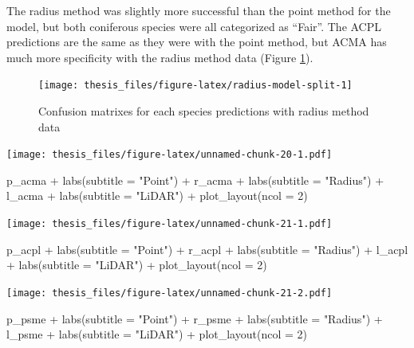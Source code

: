 \documentclass[12pt,twoside]{reedthesis}
\newenvironment{Shaded}{\begin{snugshade}}{\end{snugshade}}
\newcommand{\AttributeTok}[1]{\textcolor[rgb]{0.77,0.63,0.00}{#1}}
\newcommand{\DecValTok}[1]{\textcolor[rgb]{0.00,0.00,0.81}{#1}}
\newcommand{\FunctionTok}[1]{\textcolor[rgb]{0.00,0.00,0.00}{#1}}
\newcommand{\NormalTok}[1]{#1}
\newcommand{\SpecialCharTok}[1]{\textcolor[rgb]{0.00,0.00,0.00}{#1}}
\newcommand{\StringTok}[1]{\textcolor[rgb]{0.31,0.60,0.02}{#1}}
\begin{document}
The radius method was slightly more successful than the point method for the model, but both coniferous species were all categorized as ``Fair''. The ACPL predictions are the same as they were with the point method, but ACMA has much more specificity with the radius method data (Figure \ref{fig:radius-model-split}).
\begin{figure}
\texttt{[image: thesis\_files/figure-latex/radius-model-split-1]} \caption[Confusion matrixes for Radius data model]{Confusion matrixes for each species predictions with radius method data}\label{fig:radius-model-split}
\end{figure}
\texttt{[image: thesis\_files/figure-latex/unnamed-chunk-20-1.pdf]}
\begin{Shaded}
\begin{Highlighting}[]
\NormalTok{p\_acma }\SpecialCharTok{+} \FunctionTok{labs}\NormalTok{(}\AttributeTok{subtitle =} \StringTok{"Point"}\NormalTok{) }\SpecialCharTok{+}\NormalTok{ r\_acma }\SpecialCharTok{+} \FunctionTok{labs}\NormalTok{(}\AttributeTok{subtitle =} \StringTok{"Radius"}\NormalTok{) }\SpecialCharTok{+}
\NormalTok{    l\_acma }\SpecialCharTok{+} \FunctionTok{labs}\NormalTok{(}\AttributeTok{subtitle =} \StringTok{"LiDAR"}\NormalTok{) }\SpecialCharTok{+} \FunctionTok{plot\_layout}\NormalTok{(}\AttributeTok{ncol =} \DecValTok{2}\NormalTok{)}
\end{Highlighting}
\end{Shaded}
\texttt{[image: thesis\_files/figure-latex/unnamed-chunk-21-1.pdf]}
\begin{Shaded}
\begin{Highlighting}[]
\NormalTok{p\_acpl }\SpecialCharTok{+} \FunctionTok{labs}\NormalTok{(}\AttributeTok{subtitle =} \StringTok{"Point"}\NormalTok{) }\SpecialCharTok{+}\NormalTok{ r\_acpl }\SpecialCharTok{+} \FunctionTok{labs}\NormalTok{(}\AttributeTok{subtitle =} \StringTok{"Radius"}\NormalTok{) }\SpecialCharTok{+}
\NormalTok{    l\_acpl }\SpecialCharTok{+} \FunctionTok{labs}\NormalTok{(}\AttributeTok{subtitle =} \StringTok{"LiDAR"}\NormalTok{) }\SpecialCharTok{+} \FunctionTok{plot\_layout}\NormalTok{(}\AttributeTok{ncol =} \DecValTok{2}\NormalTok{)}
\end{Highlighting}
\end{Shaded}
\texttt{[image: thesis\_files/figure-latex/unnamed-chunk-21-2.pdf]}
\begin{Shaded}
\begin{Highlighting}[]
\NormalTok{p\_psme }\SpecialCharTok{+} \FunctionTok{labs}\NormalTok{(}\AttributeTok{subtitle =} \StringTok{"Point"}\NormalTok{) }\SpecialCharTok{+}\NormalTok{ r\_psme }\SpecialCharTok{+} \FunctionTok{labs}\NormalTok{(}\AttributeTok{subtitle =} \StringTok{"Radius"}\NormalTok{) }\SpecialCharTok{+}
\NormalTok{    l\_psme }\SpecialCharTok{+} \FunctionTok{labs}\NormalTok{(}\AttributeTok{subtitle =} \StringTok{"LiDAR"}\NormalTok{) }\SpecialCharTok{+} \FunctionTok{plot\_layout}\NormalTok{(}\AttributeTok{ncol =} \DecValTok{2}\NormalTok{)}
\end{Highlighting}
\end{Shaded}
\end{document}
